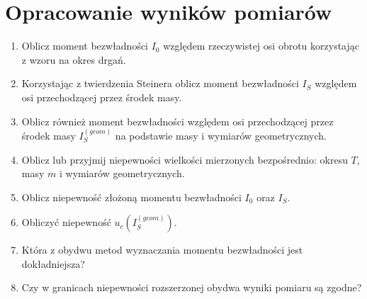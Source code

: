 \documentclass[a4paper,10pt,twoside]{article}
\begin{document}
	\section{Opracowanie wyników pomiarów}
	\begin{enumerate}
		\item Oblicz moment bezwładności $I_0$ względem rzeczywistej osi obrotu korzystając z wzoru na okres drgań.
		\item Korzystając z twierdzenia Steinera oblicz moment bezwładności $I_S$ względem osi przechodzącej przez środek masy.
		\item Oblicz również moment bezwładności względem osi przechodzącej przez środek masy $I_S^{(geom)}$ na podstawie masy i wymiarów geometrycznych.
		\item Oblicz lub przyjmij niepewności wielkości mierzonych bezpośrednio: okresu $T$, masy $m$ i wymiarów geometrycznych.
		\item Oblicz niepewność złożoną momentu bezwładności $I_0$ oraz $I_S$.
		\item Obliczyć niepewność $u_c(I_S^{(geom)})$.
		\item Która z obydwu metod wyznaczania momentu bezwładności jest dokładniejsza?
		\item Czy w granicach niepewności rozszerzonej obydwa wyniki pomiaru są zgodne?
\end{enumerate}
\end{document}
